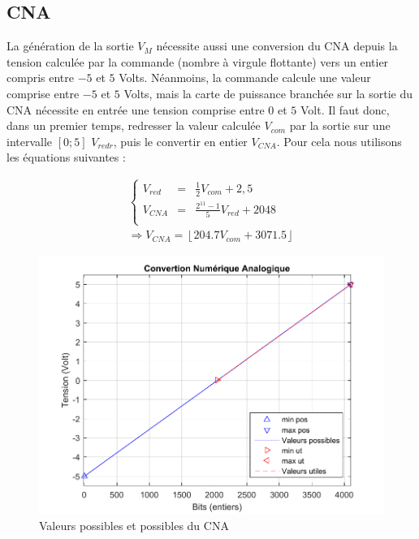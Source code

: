 \subsection{CNA}
La génération de la sortie $V_M$ nécessite aussi une conversion du CNA depuis la tension calculée par la commande (nombre à virgule flottante) vers un entier compris entre $-5$ et $5$ Volts. Néanmoins, la commande calcule une valeur comprise entre $-5$ et $5$ Volts, mais la carte de puissance branchée sur la sortie du CNA nécessite en entrée une tension comprise entre $0$ et $5$ Volt. Il faut donc, dans un premier temps, redresser la valeur calculée $V_{com}$ par la sortie sur une intervalle $\left[0;5\right]$ $V_{redr}$, puis le convertir en entier $V_{CNA}$. Pour cela nous utilisons les équations suivantes :

\begin{figure}[!ht]%
\begin{minipage}{.5\textwidth}%
\begin{equation}\label{eqn:CNA1}
\begin{array}{l}
\left\lbrace
\begin{array}{lcl}
V_{red}	&=&	\frac{1}{2}V_{com}+2,5\\
V_{CNA} &=& \frac{2^{11}-1}{5}V_{red}+2048\\
\end{array}
\right.\\
\Rightarrow V_{CNA} = \left\lfloor 204.7 V_{com} + 3071.5 \right\rfloor
\end{array}
\end{equation}	
\end{minipage}%
\hfill%
\begin{minipage}{.5\textwidth}%
\centering
\includegraphics[width=\textwidth]{./VI/images/CNA_plage.pdf}
\caption{\label{fig:CNA_p}Valeurs possibles et possibles du CNA}
\end{minipage}%
\end{figure}


